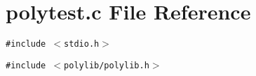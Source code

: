 \section{polytest.c File Reference}
\label{polytest_8c}
{\tt \#include $<$stdio.h$>$}\par
{\tt \#include $<$polylib/polylib.h$>$}\par
